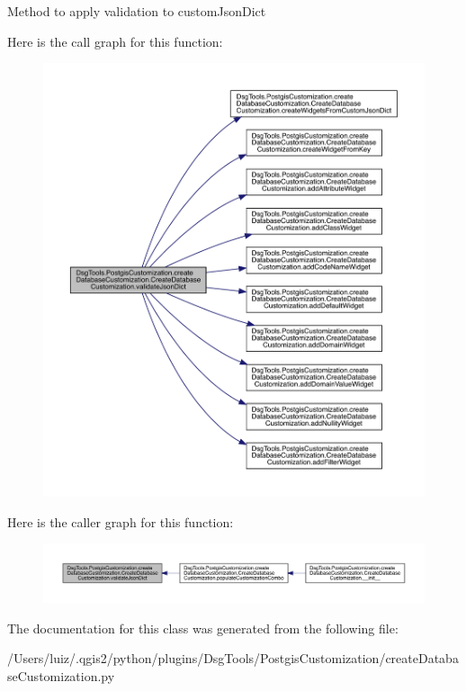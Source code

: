 \begin{DoxyVerb}Method to apply validation to customJsonDict
\end{DoxyVerb}
 Here is the call graph for this function\+:
\nopagebreak
\begin{figure}[H]
\begin{center}
\leavevmode
\includegraphics[width=350pt]{class_dsg_tools_1_1_postgis_customization_1_1create_database_customization_1_1_create_database_customization_acc95d3b4b9d2705f29439a0fef4fce56_cgraph}
\end{center}
\end{figure}
Here is the caller graph for this function\+:
\nopagebreak
\begin{figure}[H]
\begin{center}
\leavevmode
\includegraphics[width=350pt]{class_dsg_tools_1_1_postgis_customization_1_1create_database_customization_1_1_create_database_customization_acc95d3b4b9d2705f29439a0fef4fce56_icgraph}
\end{center}
\end{figure}


The documentation for this class was generated from the following file\+:\begin{DoxyCompactItemize}
\item 
/\+Users/luiz/.\+qgis2/python/plugins/\+Dsg\+Tools/\+Postgis\+Customization/create\+Database\+Customization.\+py\end{DoxyCompactItemize}
